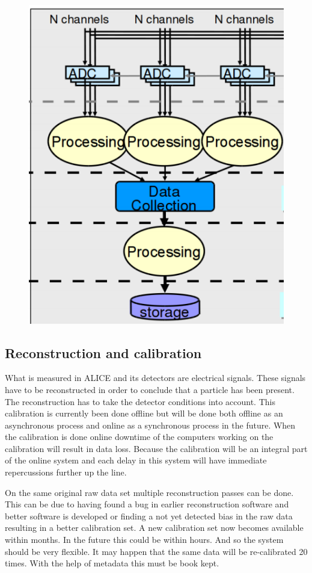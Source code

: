 \begin{figure}
  \begin{center}
    \includegraphics[scale=0.3]{daq.png}
    \caption{}
    \label{fig:}
  \end{center}
\end{figure}

\subsection{Reconstruction and calibration}
What is measured in ALICE and its detectors are electrical signals. These signals have to be reconstructed in order to conclude that a particle has been present. The reconstruction has to take the detector conditions into account. This calibration is currently been done offline but will be done both offline as an asynchronous process and online as a synchronous process in the future. When the calibration is done online downtime of the computers working on the calibration will result in data loss. Because the calibration will be an integral part of the online system and each delay in this system will have immediate repercussions further up the line.

On the same original raw data set multiple reconstruction passes can be done. This can be due to having found a bug in earlier reconstruction software and better software is developed or finding a not yet detected bias in the raw data resulting in a better calibration set. A new calibration set now becomes available within months. In the future this could be within hours. And so the system should be very flexible. It may happen that the same data will be re-calibrated 20 times. With the help of metadata this must be book kept.

